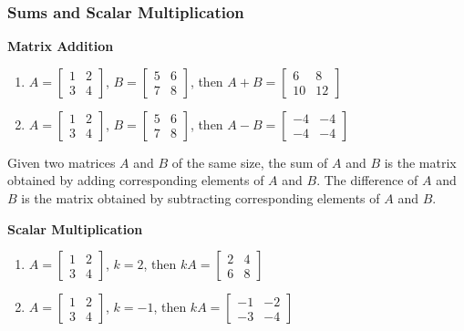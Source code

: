 \documentclass[10pt, a4paper]{article}
\begin{document}
\subsubsection*{Sums and Scalar Multiplication}
\begin{example}
    \textbf{Matrix Addition}
    \begin{enumerate}
        \item $A = \begin{bmatrix} 1 & 2 \\ 3 & 4 \end{bmatrix}$, $B = \begin{bmatrix} 5 & 6 \\ 7 & 8 \end{bmatrix}$, then $A + B = \begin{bmatrix} 6 & 8 \\ 10 & 12 \end{bmatrix}$
        \item $A = \begin{bmatrix} 1 & 2 \\ 3 & 4 \end{bmatrix}$, $B = \begin{bmatrix} 5 & 6 \\ 7 & 8 \end{bmatrix}$, then $A - B = \begin{bmatrix} -4 & -4 \\ -4 & -4 \end{bmatrix}$
    \end{enumerate}
\end{example}
Given two matrices $A$ and $B$ of the same size, the sum of $A$ and $B$ is the matrix obtained by adding corresponding elements of $A$ and $B$. The difference of $A$ and $B$ is the matrix obtained by subtracting corresponding elements of $A$ and $B$.
\begin{example}
    \textbf{Scalar Multiplication}
    \begin{enumerate}
        \item $A = \begin{bmatrix} 1 & 2 \\ 3 & 4 \end{bmatrix}$, $k = 2$, then $kA = \begin{bmatrix} 2 & 4 \\ 6 & 8 \end{bmatrix}$
        \item $A = \begin{bmatrix} 1 & 2 \\ 3 & 4 \end{bmatrix}$, $k = -1$, then $kA = \begin{bmatrix} -1 & -2 \\ -3 & -4 \end{bmatrix}$
    \end{enumerate}
\end{example}
\end{document}
